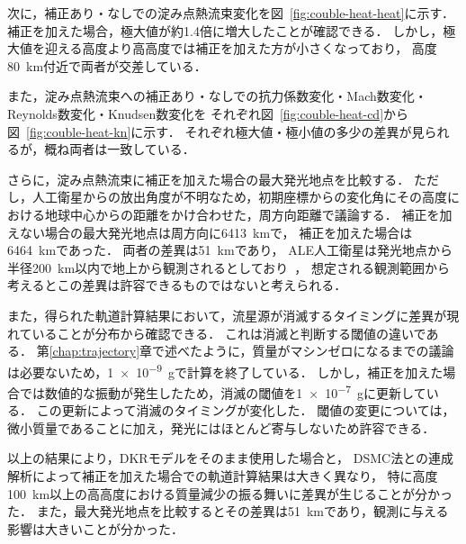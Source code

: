 次に，補正あり・なしでの淀み点熱流束変化を図~\ref{fig:couble-heat-heat}に示す．
補正を加えた場合，極大値が約1.4倍に増大したことが確認できる．
しかし，極大値を迎える高度より高高度では補正を加えた方が小さくなっており，
高度80~km付近で両者が交差している．

また，淀み点熱流束への補正あり・なしでの抗力係数変化・Mach数変化・Reynolds数変化・Knudsen数変化を
それぞれ図~\ref{fig:couble-heat-cd}から図~\ref{fig:couble-heat-kn}に示す．
それぞれ極大値・極小値の多少の差異が見られるが，概ね両者は一致している．

さらに，淀み点熱流束に補正を加えた場合の最大発光地点を比較する．
ただし，人工衛星からの放出角度が不明なため，初期座標からの変化角にその高度における地球中心からの距離をかけ合わせた，周方向距離で議論する．
補正を加えない場合の最大発光地点は周方向に6413~kmで，
補正を加えた場合は6464~kmであった．
両者の差異は51~kmであり，
ALE人工衛星は発光地点から半径200~km以内で地上から観測されるとしており~\cite{ALECoLtd30:online}，
想定される観測範囲から考えるとこの差異は許容できるものではないと考えられる．


また，得られた軌道計算結果において，流星源が消滅するタイミングに差異が現れていることが分布から確認できる．
これは消滅と判断する閾値の違いである．
第\ref{chap:trajectory}章で述べたように，質量がマシンゼロになるまでの議論は必要ないため，\SI{1e-9}{g}で計算を終了している．
しかし，補正を加えた場合では数値的な振動が発生したため，消滅の閾値を\SI{1e-7}{g}に更新している．
この更新によって消滅のタイミングが変化した．
閾値の変更については，微小質量であることに加え，発光にはほとんど寄与しないため許容できる．

以上の結果により，DKRモデルをそのまま使用した場合と，
DSMC法との連成解析によって補正を加えた場合での軌道計算結果は大きく異なり，
特に高度100~km以上の高高度における質量減少の振る舞いに差異が生じることが分かった．
また，最大発光地点を比較するとその差異は51~kmであり，観測に与える影響は大きいことが分かった．

